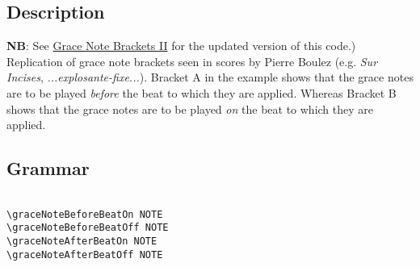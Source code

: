 \subsection{Description}
\textbf{NB}: See \hyperref[sec:gracenote2]{Grace Note Brackets II} for the updated version of this code.)
Replication of grace note brackets seen in scores by Pierre Boulez (e.g. \textit{Sur Incises}\autocite{RN1738}, \textit{...explosante-fixe...}\autocite{RN1737}). Bracket A in the example shows that the grace notes are to be played \textit{before} the beat to which they are applied. Whereas Bracket B shows that the grace notes are to be played \textit{on} the beat to which they are applied.

\subsection{Grammar}
\begin{verbatim}

\graceNoteBeforeBeatOn NOTE
\graceNoteBeforeBeatOff NOTE
\graceNoteAfterBeatOn NOTE
\graceNoteAfterBeatOff NOTE

\end{verbatim}


